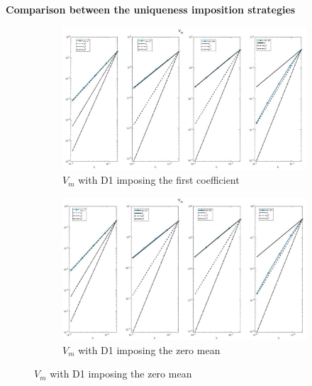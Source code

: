 \documentclass[a4paper,11pt]{article}
\begin{document}
\begin{center}
\textbf{Comparison between the uniqueness imposition strategies}
\end{center}
\begin{figure}[H]
\caption{Comparison of the trans-membrane potential ($V_m$)}
\label{Vm-unique}
\begin{subfigure}{\textwidth}
\begin{center}
\includegraphics[width = \textwidth]{./D1_Vm_1.jpg}
\caption{$V_m$ with D1 imposing the first coefficient}
\end{center}
\end{subfigure}
\begin{subfigure}{\textwidth}
\begin{center}
\includegraphics[width =\textwidth]{./D1_Vm_2.jpg}
\caption{$V_m$ with D1 imposing the zero mean}
\end{center}
\end{subfigure}
\end{figure}
\end{document}

